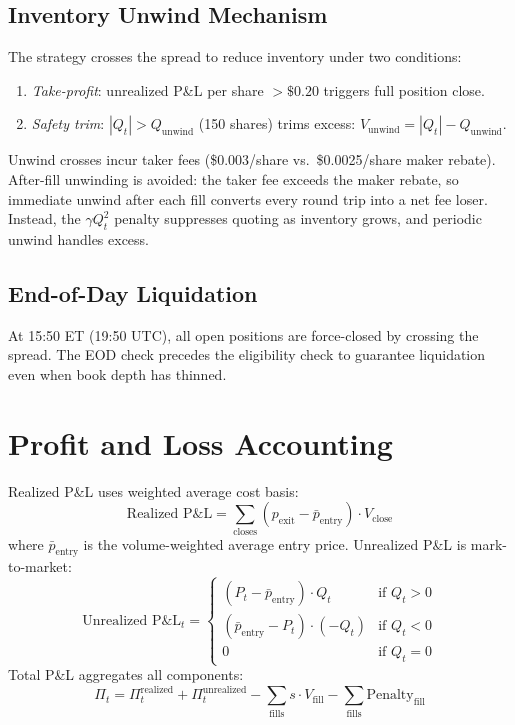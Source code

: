 \documentclass[11pt]{article}
\theoremstyle{definition}
\begin{document}
\subsection{Inventory Unwind Mechanism}

The strategy crosses the spread to reduce inventory under two conditions:
\begin{enumerate}
\item \emph{Take-profit}: unrealized P\&L per share $> \$0.20$ triggers full position close.
\item \emph{Safety trim}: $|Q_t| > Q_{\text{unwind}}$ (150 shares) trims excess: $V_{\text{unwind}} = |Q_t| - Q_{\text{unwind}}$.
\end{enumerate}

Unwind crosses incur taker fees (\$0.003/share vs.\ \$0.0025/share maker rebate). After-fill unwinding is avoided: the taker fee exceeds the maker rebate, so immediate unwind after each fill converts every round trip into a net fee loser. Instead, the $\gamma Q_t^2$ penalty suppresses quoting as inventory grows, and periodic unwind handles excess.

\subsection{End-of-Day Liquidation}

At 15:50 ET (19:50 UTC), all open positions are force-closed by crossing the spread. The EOD check precedes the eligibility check to guarantee liquidation even when book depth has thinned.

\section{Profit and Loss Accounting}

Realized P\&L uses weighted average cost basis:
\begin{equation}
\text{Realized P\&L} = \sum_{\text{closes}} (p_{\text{exit}} - \bar{p}_{\text{entry}}) \cdot V_{\text{close}}
\end{equation}
where $\bar{p}_{\text{entry}}$ is the volume-weighted average entry price. Unrealized P\&L is mark-to-market:
\begin{equation}
\text{Unrealized P\&L}_t = \begin{cases}
(P_t - \bar{p}_{\text{entry}}) \cdot Q_t & \text{if } Q_t > 0 \\
(\bar{p}_{\text{entry}} - P_t) \cdot (-Q_t) & \text{if } Q_t < 0 \\
0 & \text{if } Q_t = 0
\end{cases}
\end{equation}
Total P\&L aggregates all components:
\begin{equation}
\Pi_t = \Pi_t^{\text{realized}} + \Pi_t^{\text{unrealized}} - \sum_{\text{fills}} s \cdot V_{\text{fill}} - \sum_{\text{fills}} \text{Penalty}_{\text{fill}}
\end{equation}
\end{document}
